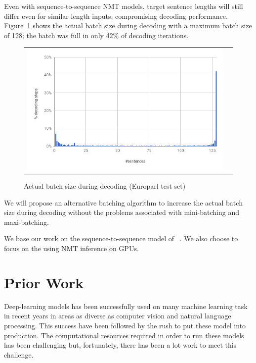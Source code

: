 \documentclass[11pt,a4paper]{article}
\begin{document}
Even with sequence-to-sequence NMT models, target sentence lengths will still differ even for similar length inputs, compromising decoding performance. Figure~\ref{fig:batch-size} shows the actual batch size during decoding with a maximum batch size of 128; the batch was full in only 42\% of decoding iterations.

\begin{figure}
\centering
\begin{tabular}{cc}
{\includegraphics[scale=0.3]{batch-size.png}} 
\end{tabular}
\caption{Actual batch size during decoding (Europarl test set)}
\label{fig:batch-size}
\end{figure} 

We will propose an alternative batching algorithm to increase the actual batch size during decoding without the problems associated with mini-batching and maxi-batching.

We base our work on the sequence-to-sequence model of ~\cite{D14-1179}. We also choose to focus on the using NMT inference on GPUs. %

\section{Prior Work}

Deep-learning models has been successfully used on many machine learning task in recent years in areas as diverse as computer vision and natural language processing. This success have been followed by the rush to put these model into production. The computational resources required in order to run these models has been challenging but, fortunately, there has been a lot work to meet this challenge.
\end{document}
